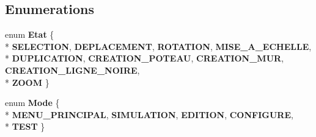 \subsection*{Enumerations}
\begin{DoxyCompactItemize}
\item 
enum {\bfseries Etat} \{ \\*
{\bfseries S\+E\+L\+E\+C\+T\+I\+ON}, 
{\bfseries D\+E\+P\+L\+A\+C\+E\+M\+E\+NT}, 
{\bfseries R\+O\+T\+A\+T\+I\+ON}, 
{\bfseries M\+I\+S\+E\+\_\+\+A\+\_\+\+E\+C\+H\+E\+L\+LE}, 
\\*
{\bfseries D\+U\+P\+L\+I\+C\+A\+T\+I\+ON}, 
{\bfseries C\+R\+E\+A\+T\+I\+O\+N\+\_\+\+P\+O\+T\+E\+AU}, 
{\bfseries C\+R\+E\+A\+T\+I\+O\+N\+\_\+\+M\+UR}, 
{\bfseries C\+R\+E\+A\+T\+I\+O\+N\+\_\+\+L\+I\+G\+N\+E\+\_\+\+N\+O\+I\+RE}, 
\\*
{\bfseries Z\+O\+OM}
 \}\hypertarget{group__inf2990_gaab0c109433ab7bd78ff6d8f6503bd0f5}{}\label{group__inf2990_gaab0c109433ab7bd78ff6d8f6503bd0f5}

\item 
enum {\bfseries Mode} \{ \\*
{\bfseries M\+E\+N\+U\+\_\+\+P\+R\+I\+N\+C\+I\+P\+AL}, 
{\bfseries S\+I\+M\+U\+L\+A\+T\+I\+ON}, 
{\bfseries E\+D\+I\+T\+I\+ON}, 
{\bfseries C\+O\+N\+F\+I\+G\+U\+RE}, 
\\*
{\bfseries T\+E\+ST}
 \}\hypertarget{group__inf2990_ga8c2570a65bc0f1d1b51cc7e233eb5f3e}{}\label{group__inf2990_ga8c2570a65bc0f1d1b51cc7e233eb5f3e}

\end{DoxyCompactItemize}

